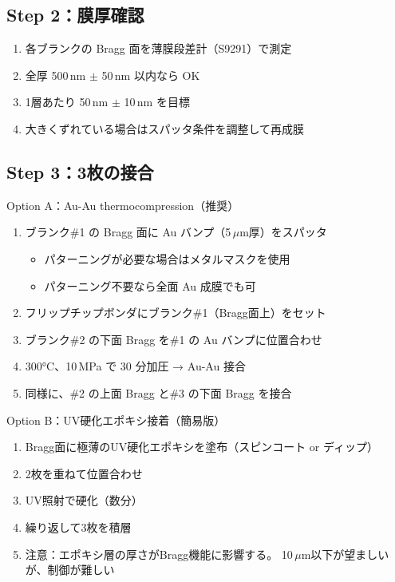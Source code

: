 \documentclass[11pt,a4paper]{article}
\def\textbf#1{#1}%
\begin{document}
\subsection{Step 2：膜厚確認}

\begin{enumerate}[leftmargin=*]
\item 各ブランクの Bragg 面を薄膜段差計（S9291）で測定
\item 全厚 500\,nm $\pm$ 50\,nm 以内なら OK
\item 1層あたり 50\,nm $\pm$ 10\,nm を目標
\item 大きくずれている場合はスパッタ条件を調整して再成膜
\end{enumerate}

\subsection{Step 3：3枚の接合}

\textbf{Option A：Au-Au thermocompression（推奨）}

\begin{enumerate}[leftmargin=*]
\item ブランク\#1 の Bragg 面に Au バンプ（5\,$\mu$m厚）をスパッタ
  \begin{itemize}
  \item パターニングが必要な場合はメタルマスクを使用
  \item パターニング不要なら全面 Au 成膜でも可
  \end{itemize}
\item フリップチップボンダにブランク\#1（Bragg面上）をセット
\item ブランク\#2 の下面 Bragg を\#1 の Au バンプに位置合わせ
\item 300°C、10\,MPa で 30 分加圧 → Au-Au 接合
\item 同様に、\#2 の上面 Bragg と\#3 の下面 Bragg を接合
\end{enumerate}

\textbf{Option B：UV硬化エポキシ接着（簡易版）}

\begin{enumerate}[leftmargin=*]
\item Bragg面に極薄のUV硬化エポキシを塗布（スピンコート or ディップ）
\item 2枚を重ねて位置合わせ
\item UV照射で硬化（数分）
\item 繰り返して3枚を積層
\item \textbf{注意}：エポキシ層の厚さがBragg機能に影響する。
  10\,$\mu$m以下が望ましいが、制御が難しい
\end{enumerate}
\end{document}
